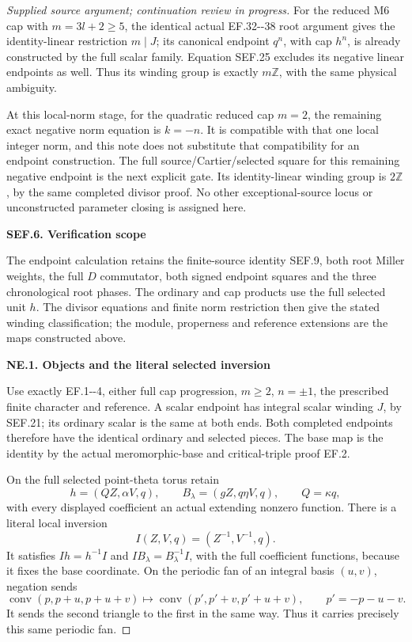 \begin{proof}[Supplied source argument; continuation review in progress]
For the reduced M6 cap with \(m=3l+2\ge5\), the identical actual
EF.32-\/-38 root argument gives the identity-linear restriction
\(m\mid J\); its canonical endpoint \(q^n\), with cap \(h^n\), is
already constructed by the full scalar family. Equation SEF.25
excludes its negative linear endpoints as well. Thus its winding
group is exactly \(m\mathbb Z\), with the same physical ambiguity.

At this local-norm stage, for the quadratic reduced cap \(m=2\), the remaining exact negative
norm equation is \(k=-n\). It is compatible with that one local
integer norm, and this note does not substitute that compatibility
for an endpoint construction. The full source/Cartier/selected
square for this remaining negative endpoint is the next explicit
gate. Its identity-linear winding group is \(2\mathbb Z\), by the
same completed divisor proof. No other exceptional-source locus
or unconstructed parameter closing is assigned here.

\par

\medskip\noindent\textbf{SEF.6. Verification scope}

\par\nobreak

The endpoint calculation retains the finite-source identity SEF.9,
both root Miller weights, the full $D$ commutator, both signed endpoint
squares and the three chronological root phases. The ordinary and cap
products use the full selected unit $h$. The divisor equations and finite
norm restriction then give the stated winding classification; the module,
properness and reference extensions are the maps constructed above.

\par

\medskip\noindent\textbf{NE.1. Objects and the literal selected inversion}

\par\nobreak

Use exactly EF.1-\/-4, either full cap progression, \(m\ge2\),
\(n=\pm1\), the prescribed finite character and reference. A scalar
endpoint has integral scalar winding \(J\), by SEF.21; its ordinary
scalar is the same at both ends. Both completed endpoints therefore
have the identical ordinary and selected pieces. The base map is the
identity by the actual meromorphic-base and critical-triple proof EF.2.

On the full selected point-theta torus retain
\[
 h=(QZ,\alpha V,q),\qquad B_\lambda=(gZ,q\eta V,q),
 \qquad Q=\kappa q,
 \tag{NE.1}
\]
with every displayed coefficient an actual extending nonzero function.
There is a literal local inversion
\[
                  I(Z,V,q)=(Z^{-1},V^{-1},q).
 \tag{NE.2}
\]
It satisfies \(Ih=h^{-1}I\) and
\(IB_\lambda=B_\lambda^{-1}I\), with the full coefficient functions,
because it fixes the base coordinate. On the periodic fan of an
integral basis \((u,v)\), negation sends
\[
 \operatorname{conv}(p,p+u,p+u+v)
 \longmapsto
 \operatorname{conv}(p',p'+v,p'+u+v),\qquad p'=-p-u-v.
 \tag{NE.3}
\]
It sends the second triangle to the first in the same way. Thus it
carries precisely this same periodic fan.


\end{proof}
